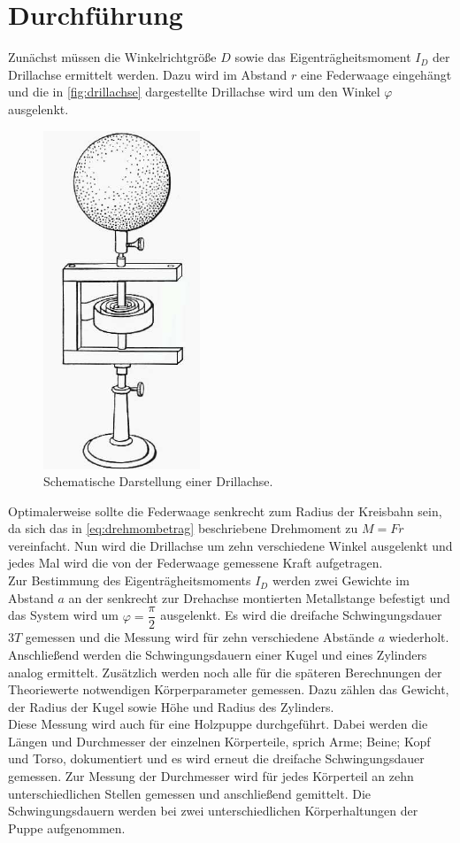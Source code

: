 \section{Durchführung}
\label{sec:Durchführung}
Zunächst müssen die Winkelrichtgröße $D$ sowie das Eigenträgheitsmoment $I_D$ der Drillachse ermittelt werden. Dazu wird im Abstand $r$ eine Federwaage eingehängt 
und die in \autoref{fig:drillachse} dargestellte Drillachse wird um den Winkel $\varphi$ ausgelenkt. 
\begin{figure}[H]
    \centering
    \includegraphics{Drillachse.pdf}
    \caption{Schematische Darstellung einer Drillachse\cite{ap05}.}
    \label{fig:drillachse}
\end{figure}
Optimalerweise sollte die Federwaage senkrecht zum Radius der Kreisbahn sein, da sich das in \eqref{eq:drehmombetrag} beschriebene Drehmoment zu $M =F r$ vereinfacht.
Nun wird die Drillachse um zehn verschiedene Winkel ausgelenkt und jedes Mal wird die von der Federwaage gemessene Kraft aufgetragen. \\

Zur Bestimmung des Eigenträgheitsmoments $I_D$ werden zwei Gewichte im Abstand $a$ an der senkrecht zur Drehachse montierten Metallstange befestigt und das System wird um $\varphi = \dfrac{π}{2}$ ausgelenkt.
Es wird die dreifache Schwingungsdauer $3T$ gemessen und die Messung wird für zehn verschiedene Abstände $a$ wiederholt. \\

Anschließend werden die Schwingungsdauern einer Kugel und eines Zylinders analog ermittelt. Zusätzlich werden noch alle für die späteren Berechnungen der Theoriewerte notwendigen Körperparameter gemessen.
Dazu zählen das Gewicht, der Radius der Kugel sowie Höhe und Radius des Zylinders. \\

Diese Messung wird auch für eine Holzpuppe durchgeführt. Dabei werden die Längen und Durchmesser der einzelnen Körperteile, sprich Arme; Beine; Kopf und Torso, dokumentiert und es wird erneut die dreifache Schwingungsdauer
gemessen. Zur Messung der Durchmesser wird für jedes Körperteil an zehn unterschiedlichen Stellen gemessen und anschließend gemittelt. Die Schwingungsdauern werden bei zwei unterschiedlichen Körperhaltungen der Puppe aufgenommen.
